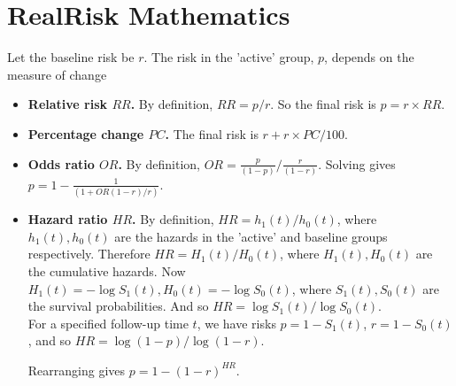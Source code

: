 \documentclass[12pt]{article}
\begin{document}
\parindent=0pt
\parskip=5pt

\section*{RealRisk Mathematics}

Let the baseline risk be $r$.  The risk in the 'active' group, $p$, depends on the measure of change
\begin{itemize}
\item {\bf Relative risk $RR$.}  By definition, $RR = p/r$.  So the final risk is $p = r \times RR$.
\item {\bf Percentage change  $PC$.}   The final risk is $r + r \times PC/100$.
\item {\bf Odds ratio  $OR$.}  By definition, $OR = \frac{p}{(1-p)} / \frac{r}{(1-r)}$.  Solving gives $p = 1- \frac{1}{(1+ OR(1-r)/r)}$.
\item {\bf Hazard ratio  $HR$.}   By definition, $HR = h_1(t)/h_0(t)$, where $h_1(t), h_0(t)$ are the  hazards in the 'active' and baseline groups respectively. Therefore $HR = H_1(t)/H_0(t)$, where $H_1(t), H_0(t)$ are the cumulative hazards. Now $H_1(t) = -\log S_1(t), H_0(t) = -\log S_0(t)$, where $S_1(t), S_0(t)$ are the survival probabilities.   And so $HR = \log S_1(t)/ \log S_0(t).$\\

For a specified follow-up time $t$, we have risks $p = 1- S_1(t)$, $r = 1- S_0(t)$, and so $HR = \log (1-p) / \log (1-r)$.

Rearranging gives  $p = 1 - (1-r)^{HR}$.
\end{itemize}






 
\end{document}
